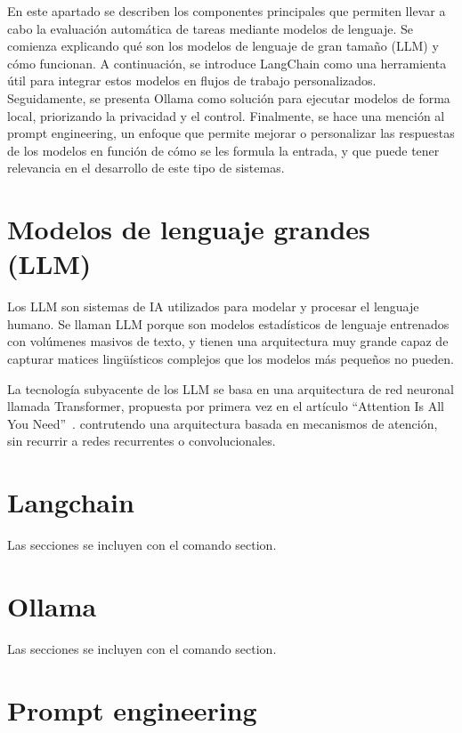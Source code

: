 
En este apartado se describen los componentes principales que permiten llevar 
a cabo la evaluación automática de tareas mediante modelos de lenguaje. 
Se comienza explicando qué son los modelos de lenguaje de gran tamaño (LLM) 
y cómo funcionan. A continuación, se introduce LangChain como una herramienta 
útil para integrar estos modelos en flujos de trabajo personalizados. 
Seguidamente, se presenta Ollama como solución para ejecutar modelos de forma 
local, priorizando la privacidad y el control. Finalmente, se hace una mención 
al prompt engineering, un enfoque que permite mejorar o personalizar las 
respuestas de los modelos en función de cómo se les formula la entrada, y 
que puede tener relevancia en el desarrollo de este tipo de sistemas.

\section{Modelos de lenguaje grandes (LLM)}

Los LLM son sistemas de IA utilizados para modelar y procesar el lenguaje humano.
Se llaman LLM porque son modelos estadísticos de lenguaje entrenados con volúmenes 
masivos de texto, y tienen una arquitectura muy grande capaz de capturar matices 
lingüísticos complejos que los modelos más pequeños no pueden.

La tecnología subyacente de los LLM se basa en una arquitectura de red neuronal llamada 
Transformer, propuesta por primera vez en el artículo ``Attention Is All You Need''~\cite{vaswani2017}. 
contrutendo una arquitectura basada en mecanismos de atención, sin recurrir a 
redes recurrentes o convolucionales.

\section{Langchain }

Las secciones se incluyen con el comando section.

\section{Ollama}

Las secciones se incluyen con el comando section.

\section{Prompt engineering}

